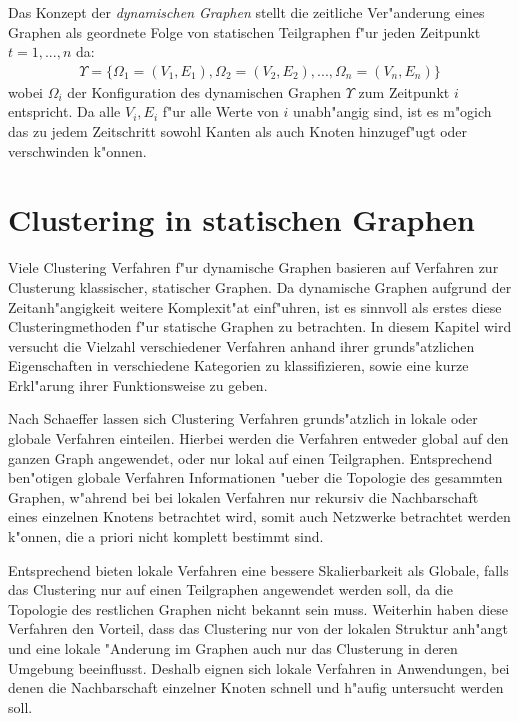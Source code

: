 \documentclass[journal]{vgtc}
\begin{document}
	Das Konzept der \emph{dynamischen Graphen}\cite{modularity} stellt die zeitliche Ver"anderung eines Graphen
	als geordnete Folge von statischen Teilgraphen f"ur jeden Zeitpunkt $t=1,...,n$ da:
	\begin{align}
		\Upsilon=\{\Omega_1=(V_1, E_1), \Omega_2=(V_2, E_2), ..., \Omega_n=(V_n,E_n)\}
	\end{align}
	wobei $\Omega_i$ der Konfiguration des dynamischen Graphen $\Upsilon$ zum Zeitpunkt $i$ entspricht.
	Da alle $V_i, E_i$ f"ur alle Werte von $i$ unabh"angig sind, ist es m"ogich das zu jedem Zeitschritt
	sowohl Kanten als auch Knoten hinzugef"ugt oder verschwinden k"onnen.
  
\section{Clustering in statischen Graphen}
  \label{sec:static_clustering}

  Viele Clustering Verfahren f"ur dynamische Graphen basieren auf Verfahren zur Clusterung klassischer,
  statischer Graphen. Da dynamische Graphen aufgrund der Zeitanh"angigkeit weitere Komplexit"at einf"uhren,
  ist es sinnvoll als erstes diese Clusteringmethoden f"ur statische Graphen zu betrachten.
  In diesem Kapitel wird versucht die Vielzahl verschiedener Verfahren anhand ihrer grunds"atzlichen Eigenschaften
  in verschiedene Kategorien zu klassifizieren, sowie eine kurze Erkl"arung ihrer Funktionsweise zu geben.
  
  Nach Schaeffer \cite{Schaeffer} lassen sich Clustering Verfahren grunds"atzlich in lokale oder globale
  Verfahren einteilen. Hierbei werden die Verfahren entweder global auf den ganzen Graph angewendet,
  oder nur lokal auf einen Teilgraphen. Entsprechend ben"otigen globale Verfahren Informationen "ueber 
  die Topologie des gesammten Graphen, w"ahrend bei bei lokalen Verfahren nur rekursiv die Nachbarschaft
  eines einzelnen Knotens betrachtet wird, somit auch Netzwerke betrachtet werden k"onnen, die a priori
  nicht komplett bestimmt sind.
  
  Entsprechend bieten lokale Verfahren eine bessere Skalierbarkeit als Globale, falls das Clustering nur
  auf einen Teilgraphen angewendet werden soll, da die Topologie des restlichen Graphen nicht bekannt sein muss.
  Weiterhin haben diese Verfahren den Vorteil, dass das Clustering nur von der lokalen Struktur anh"angt und eine
  lokale "Anderung im Graphen auch nur das Clusterung in deren Umgebung beeinflusst. Deshalb eignen sich lokale
  Verfahren in Anwendungen, bei denen die Nachbarschaft einzelner Knoten schnell und h"aufig untersucht werden soll.
  
\end{document}
